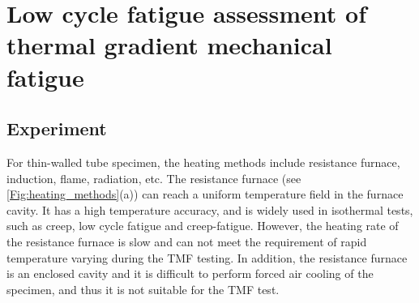 \chapter{Low cycle fatigue assessment of thermal gradient mechanical fatigue}


\section{Experiment}
\noindent
For thin-walled tube specimen, the heating methods include resistance furnace, induction, flame, radiation, etc.
The resistance furnace (see \ref{Fig:heating_methods}(a)) can reach a uniform temperature field in the furnace cavity. It has a high temperature accuracy, and is widely used in isothermal tests, such as creep, low cycle fatigue and creep-fatigue. However, the heating rate of the resistance furnace is slow and can not meet the requirement of rapid temperature varying during the TMF testing. In addition, the resistance furnace is an enclosed cavity and it is difficult to perform forced air cooling of the specimen, and thus it is not suitable for the TMF test.

